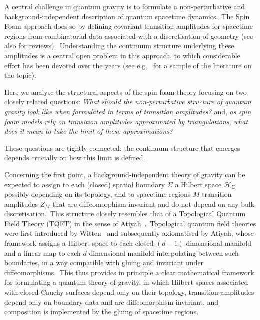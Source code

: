 \documentclass[11pt]{article}
\newcommand{\Hil}{\mathcal{H}}
\theoremstyle{definition}
\numberwithin{equation}{section}
\begin{document}
A central challenge in quantum gravity is to formulate a non-perturbative and background-independent description of quantum spacetime dynamics.~The Spin Foam approach does so by defining covariant transition amplitudes for spacetime regions from combinatorial data associated with a discretisation of geometry \cite{Rovelli_Vidotto_2014} (see also \cite{Baez:1999sr,Perez_2013,Bianchi:2017hjl,Engle_Speziale_2023} for reviews).~Understanding the continuum structure underlying these amplitudes is a central open problem in this approach, to which considerable effort has been devoted over the years (see e.g.~\cite{Reisenberger_Rovelli_1997,Reisenberger:2000fy,Dittrich:2008pw,Bahr:2010cq,Bahr:2011uj,Rovelli_Smerlak_2012,Dittrich:2012jq,Dittrich:2013xwa,Oriti:2014yla,Dittrich:2014ala,Rovelli_2022,Asante_Dittrich_Steinhaus_2023,Han:2025emp,Han:2026hyq} for a sample of the literature on the topic).

Here we analyse the structural aspects of the spin foam theory focusing on two closely related questions: \textit{What should the non-perturbative structure of quantum gravity look like when formulated in terms of transition amplitudes?} and, \textit{as spin foam models rely on transition amplitudes approximated by triangulations, what does it mean to take the limit of these approximations?}

These questions are tightly connected: the continuum structure that emerges depends crucially on how this limit is defined. 

Concerning the first point, a background-independent theory of gravity can be  expected to assign to each (closed) spatial boundary $\Sigma$ a Hilbert space $\Hil_\Sigma$ possibly depending on its topology, and to spacetime regions $M$ transition amplitudes $Z_M$ that are diffeomorphism invariant and do not depend on any bulk discretisation.~This  structure closely resembles that of a Topological Quantum Field Theory (TQFT) in the sense of Atiyah~\cite{Atiyah_1988}.~Topological quantum field theories were first introduced by Witten~\cite{Witten_1988a,Witten_1988b,Witten_1989} and subsequently axiomatised by Atiyah, whose framework assigns a Hilbert space to each closed $(d-1)$-dimensional manifold and a linear map to each $d$-dimensional manifold interpolating between such boundaries, in a way compatible with gluing and invariant under diffeomorphisms.~This thus provides in principle a clear mathematical framework for formulating a quantum theory of gravity, in which Hilbert spaces associated with closed Cauchy surfaces depend only on their topology, transition amplitudes depend only on boundary data and are diffeomorphism invariant, and composition is implemented by the gluing of spacetime regions.
\end{document}
